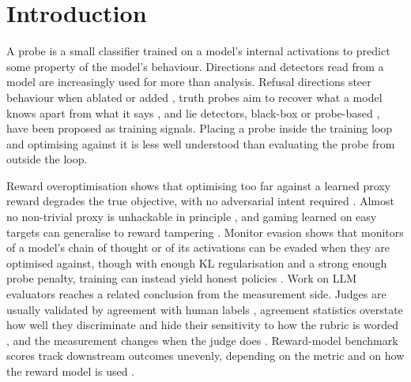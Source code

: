 \documentclass{article}
\begin{document}
\section{Introduction}

A probe is a small classifier trained on a model's internal activations to predict some property of the model's behaviour. Directions and detectors read from a model are increasingly used for more than analysis. Refusal directions steer behaviour when ablated or added \citep{arditi2024refusal}, truth probes aim to recover what a model knows apart from what it says \citep{burns2022discovering}, and lie detectors, black-box \citep{pacchiardi2023lie} or probe-based \citep{taufeeque2026atlas}, have been proposed as training signals. Placing a probe inside the training loop and optimising against it is less well understood than evaluating the probe from outside the loop.

Reward overoptimisation shows that optimising too far against a learned proxy reward degrades the true objective, with no adversarial intent required \citep{gao2023scaling, coste2023reward}. Almost no non-trivial proxy is unhackable in principle \citep{skalse2022defining}, and gaming learned on easy targets can generalise to reward tampering \citep{denison2024sycophancy}. Monitor evasion shows that monitors of a model's chain of thought \citep{baker2025monitoring} or of its activations \citep{gupta2025rlobfuscation, bailey2024obfuscated} can be evaded when they are optimised against, though with enough KL regularisation and a strong enough probe penalty, training can instead yield honest policies \citep{taufeeque2026atlas}. Work on LLM evaluators reaches a related conclusion from the measurement side. Judges are usually validated by agreement with human labels \citep{zheng2023judging}, agreement statistics overstate how well they discriminate \citep{norman2026reliability} and hide their sensitivity to how the rubric is worded \citep{weng2026invariance}, and the measurement changes when the judge does \citep{yang2026auditing}. Reward-model benchmark scores track downstream outcomes unevenly, depending on the metric and on how the reward model is used \citep{frick2024ppe, malik2025rewardbench2}.
\end{document}
